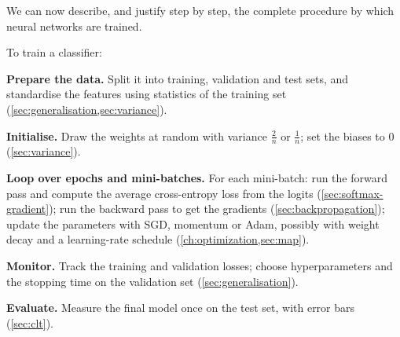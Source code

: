 We can now describe, and justify step by step, the complete procedure by which
neural networks are trained.

\begin{algorithm}\label{alg:training}
To train a classifier:
\begin{steps}
  \item \textbf{Prepare the data.} Split it into training, validation and test
    sets, and standardise the features using statistics of the training set
    (\cref{sec:generalisation,sec:variance}).
  \item \textbf{Initialise.} Draw the weights at random with variance $\frac2n$
    or $\frac1n$; set the biases to $0$ (\cref{sec:variance}).
  \item \textbf{Loop over epochs and mini-batches.} For each mini-batch: run the
    forward pass and compute the average cross-entropy loss from the logits
    (\cref{sec:softmax-gradient}); run the backward pass to get the gradients
    (\cref{sec:backpropagation}); update the parameters with SGD, momentum or Adam,
    possibly with weight decay and a learning-rate schedule
    (\cref{ch:optimization,sec:map}).
  \item \textbf{Monitor.} Track the training and validation losses; choose
    hyperparameters and the stopping time on the validation set
    (\cref{sec:generalisation}).
  \item \textbf{Evaluate.} Measure the final model once on the test set, with
    error bars (\cref{sec:clt}).
\end{steps}
\end{algorithm}

